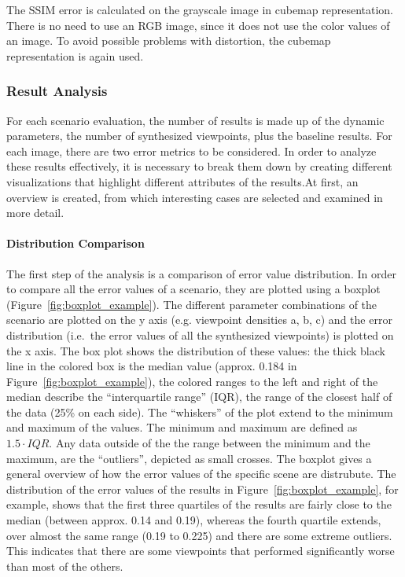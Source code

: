 The SSIM error is calculated on the grayscale image in cubemap representation. There is no need to use an RGB image, since it does not use the color values of an image. To avoid possible problems with distortion, the cubemap representation is again used.

\subsubsection{Result Analysis}
For each scenario evaluation, the number of results is made up of the dynamic parameters, the number of synthesized viewpoints, plus the baseline results. For each image, there are two error metrics to be considered.
In order to analyze these results effectively, it is necessary to break them down by creating different visualizations that highlight different attributes of the results.At first, an overview is created, from which interesting cases are selected and examined in more detail.

\paragraph{Distribution Comparison}
The first step of the analysis is a comparison of error value distribution. In order to compare all the error values of a scenario, they are plotted using a boxplot (Figure~\ref{fig:boxplot_example}). The different parameter combinations of the scenario are plotted on the y axis (e.g. viewpoint densities a, b, c) and the error distribution (i.e.\ the error values of all the synthesized viewpoints) is plotted on the x axis. The box plot shows the distribution of these values: the thick black line in the colored box is the median value (approx. 0.184 in Figure~\ref{fig:boxplot_example}), the colored ranges to the left and right of the median describe the ``interquartile range'' (IQR), the range of the closest half of the data (25\% on each side). The ``whiskers'' of the plot extend to the minimum and maximum of the values. The minimum and maximum are defined as $1.5\cdot IQR$. Any data outside of the the range between the minimum and the maximum, are the ``outliers'', depicted as small crosses. The boxplot gives a general overview of how the error values of the specific scene are distrubute. The distribution of the error values of the results in Figure~\ref{fig:boxplot_example}, for example, shows that the first three quartiles of the results are fairly close to the median (between approx. 0.14 and 0.19), whereas the fourth quartile extends, over almost the same range (0.19 to 0.225) and there are some extreme outliers. This indicates that there are some viewpoints that performed significantly worse than most of the others.

